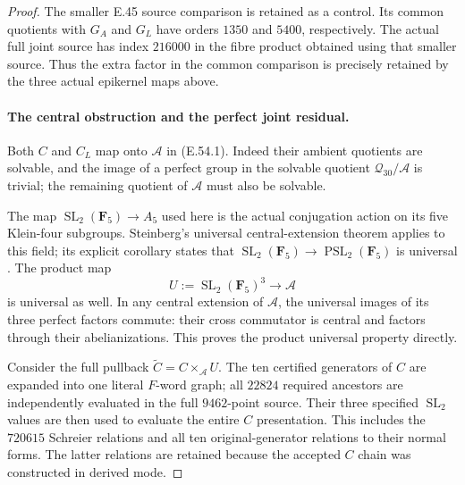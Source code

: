 \begin{proof}
The smaller E.45 source comparison is retained as a control.
Its common quotients with $G_A$ and $G_L$ have orders $1350$
and $5400$, respectively.  The actual full joint source has
index $216000$ in the fibre product obtained using that
smaller source.  Thus the extra factor in the common
comparison is precisely retained by the three actual
epikernel maps above.

\paragraph{The central obstruction and the perfect joint residual.}
Both $C$ and $C_L$ map onto $\mathcal A$ in
\textup{(E.54.1)}.  Indeed their ambient quotients are
solvable, and the image of a perfect group in the solvable
quotient $\mathcal Q_{30}/\mathcal A$ is trivial; the
remaining quotient of $\mathcal A$ must also be solvable.

The map $\operatorname{SL}_2(\mathbf F_5)\to A_5$ used here
is the actual conjugation action on its five Klein-four
subgroups.  Steinberg's universal central-extension theorem
applies to this field; its explicit corollary states that
$\operatorname{SL}_2(\mathbf F_5)\to\operatorname{PSL}_2
(\mathbf F_5)$ is universal
\cite[\S7, Theorem 10 and Corollary 2(b)]{DE_Steinberg1967}.
The product map
\[
 U:=\operatorname{SL}_2(\mathbf F_5)^3
                      \longrightarrow\mathcal A
 \tag{E.54.14}
\]
is universal as well.  In any central extension of
$\mathcal A$, the universal images of its three perfect
factors commute: their cross commutator is central and
factors through their abelianizations.  This proves the
product universal property directly.

Consider the full pullback $\widetilde C=C\times_{\mathcal A}U$.
The ten certified generators of $C$ are expanded into one
literal $F$-word graph; all $22824$ required ancestors are
independently evaluated in the full $9462$-point source.
Their three specified $\operatorname{SL}_2$ values are then
used to evaluate the entire $C$ presentation.  This includes
the $720615$ Schreier relations and all ten original-generator
relations to their normal forms.  The latter relations are
retained because the accepted $C$ chain was constructed in
derived mode.


\end{proof}
